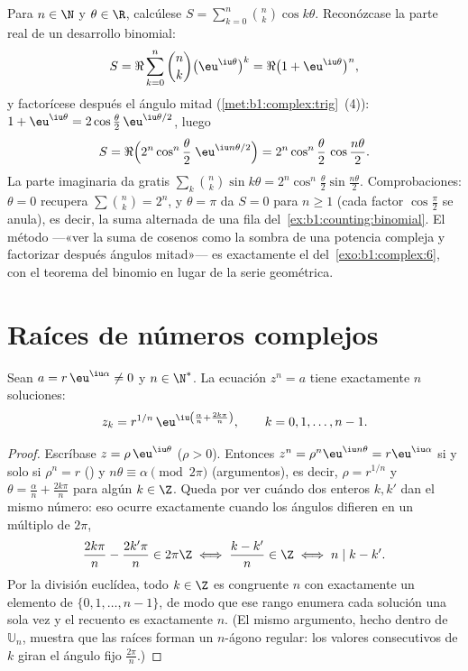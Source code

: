 \begin{example}\label{ex:b1:complex:binomsum}
Para $n \in \N$ y $\theta \in \R$, calcúlese
$S = \sum_{k=0}^{n}\binom nk \cos k\theta$. Reconózcase la parte real
de un desarrollo binomial:
\[
S = \Re\sum_{k=0}^n \binom nk \bigl(\eu^{\iu\theta}\bigr)^k
= \Re\bigl(1 + \eu^{\iu\theta}\bigr)^n ,
\]
y factorícese después el ángulo mitad (\cref{met:b1:complex:trig}~(4)):
$1 + \eu^{\iu\theta} = 2\cos\frac\theta2\,\eu^{\iu\theta/2}$, luego
\[
S = \Re\Bigl(2^n\cos^n\frac\theta2\;\eu^{\iu n\theta/2}\Bigr)
= 2^n \cos^n\frac\theta2\,\cos\frac{n\theta}2 .
\]
La parte imaginaria da gratis $\sum_k\binom nk\sin k\theta =
2^n\cos^n\frac\theta2\sin\frac{n\theta}2$. Comprobaciones: $\theta = 0$
recupera $\sum\binom nk = 2^n$, y $\theta = \pi$ da $S = 0$ para
$n \geq 1$ (cada factor $\cos\frac\pi2$ se anula), es decir, la suma
alternada de una fila del~\cref{ex:b1:counting:binomial}. El método
---«ver la suma de cosenos como la sombra de una potencia compleja y
factorizar después ángulos mitad»--- es exactamente el
del~\cref{exo:b1:complex:6}, con el teorema del binomio en lugar de la
serie geométrica.
\end{example}

\section{Raíces de números complejos}

\begin{theorem}\label{thm:b1:complex:roots}
Sean $a = r\,\eu^{\iu\alpha} \neq 0$ y $n \in \N^*$. La ecuación
$z^n = a$ tiene exactamente $n$ soluciones:
\[
z_k = r^{1/n}\, \eu^{\iu\left(\frac{\alpha}{n} +
\frac{2k\pi}{n}\right)},
\qquad k = 0, 1, \dots, n - 1 .
\]
\end{theorem}

\begin{proof}
Escríbase $z = \rho\,\eu^{\iu\theta}$ ($\rho > 0$). Entonces
$z^n = \rho^n \eu^{\iu n\theta} = r \eu^{\iu\alpha}$ si y solo si
$\rho^n = r$ () y $n\theta \equiv \alpha \pmod{2\pi}$
(argumentos), es decir, $\rho = r^{1/n}$ y
$\theta = \frac{\alpha}{n} + \frac{2k\pi}{n}$ para algún $k \in \Z$.
Queda por ver cuándo dos enteros $k, k'$ dan el mismo número: eso
ocurre exactamente cuando los ángulos difieren en un múltiplo de $2\pi$,
\[
\frac{2k\pi}n - \frac{2k'\pi}n \in 2\pi\Z
\iff \frac{k - k'}n \in \Z
\iff n \mid k - k' .
\]
Por la división euclídea, todo $k \in \Z$ es congruente  $n$ con
exactamente un elemento de $\{0, 1, \dots, n-1\}$, de modo que ese
rango enumera cada solución una sola vez y el recuento es exactamente
$n$. (El mismo argumento, hecho dentro de $\mathbb U_n$, muestra que
las raíces forman un $n$-ágono regular: los valores consecutivos de $k$
giran el ángulo fijo $\frac{2\pi}n$.)
\end{proof}

